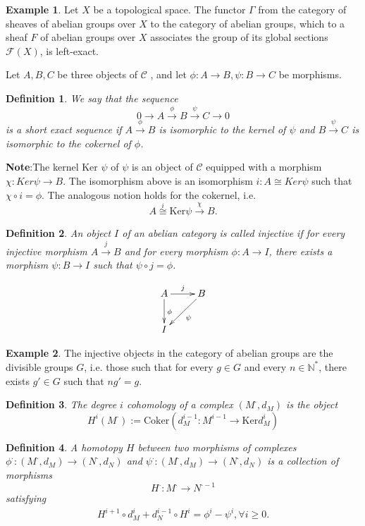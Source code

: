 \documentclass{article}
\numberwithin{equation}{subsection} %
\newtheorem{defi}{Definition}[section]
\theoremstyle{definition}
\newtheorem{ex}{Example}[section]
\begin{document}
\begin{ex}
Let $X$ be a topological space. The functor $\Gamma$ from the category
of sheaves of abelian groups over $X$ to the category of abelian groups, which to
a sheaf $F$ of abelian groups over $X$ associates the group of its global sections
$\mathcal F(X)$, is left-exact.
\end{ex}
Let $A, B,C$ be three objects of $\mathcal{C}$ , and let $\phi : A \to B,\psi : B \to C$ be morphisms.


\begin{defi}
	We say that the sequence
	\[
	0 \to A \overset{\phi}{\to} B\overset{\psi}{\to} C \to 0
	\]
	is a short exact sequence if $A \overset{\phi}{\to} B$ is isomorphic to the kernel of $\psi$ and
	$B\overset{\psi}{\to} C$ is isomorphic to the cokernel of $\phi$. 
\end{defi}
\textbf{Note}:The kernel Ker $\psi$ of $\psi$ is an object
of $\mathcal C$ equipped with a morphism $\chi:Ker \psi \to B$. The isomorphism above is an
isomorphism $i : A \cong Ker \psi$ such that $\chi \circ i =\phi$. The analogous notion holds
for the cokernel, i.e.
$$ A \overset{i}{\cong} \text{Ker}\psi \overset{\chi}{\to} B.$$

\begin{defi}
	An object $I$ of an abelian category is called injective if for
	every injective morphism $A\overset{j}{\to}B$ and for every morphism $\phi : A \to I$, there
	exists a morphism $\psi : B \to I$ such that $\psi \circ j =\phi$.
\end{defi}
$$ \xymatrix{
	A\ar[d]^\phi \ar[r]^j & B\ar[dl]^\psi \\
	I
}$$
\begin{ex}
	The injective objects in the category of abelian groups are the divisible groups $G$,
	i.e. those such that for every $g \in G$ and every $n \in \mathbb N^\ast$, there exists $g' \in G$ such
that $ng' = g$.
\end{ex}
\begin{defi}
	The degree $i$ cohomology of a complex $(M^\cdot,d_M)$ is the object
	$$ H^i(M^\cdot):= \text{Coker}\left(d^{i-1}_M: M^{i-1}\to 
	\text{Ker}d^i_M \right)$$
\end{defi}

\begin{defi}
	A homotopy $H$ between two morphisms of complexes $\phi^\cdot:(M^\cdot,d_M)\to(N^\cdot,d_N)$ and $\psi^\cdot:(M^\cdot,d_M)\to(N^\cdot,d_N)$ is a collection of morphisms
	\[
	H^\cdot:M^\cdot \to N^{\cdot -1}
	\]
	satisfying
	\begin{align}
	\label{eq4.6}
	H^{i+1}\circ d^i_M+d^{i-1}_N\circ H^i=\phi^i-\psi^i, \forall i\ge 0.
	\end{align}
\end{defi}
\end{document}

